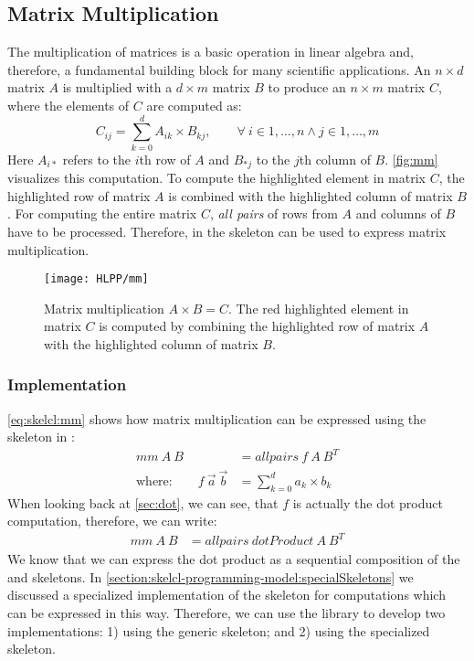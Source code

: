 \subsection{Matrix Multiplication}

The multiplication of matrices is a basic operation in linear algebra and, therefore, a fundamental building block for many scientific applications.
An $n\times d$ matrix $A$ is multiplied with a $d\times m$ matrix $B$ to produce an $n\times m$ matrix $C$, where the elements of $C$ are computed as:
\begin{equation*}
  C_{ij} = \sum_{k=0}^{d} A_{ik} \times B_{kj}, \qquad \forall\ i \in 1, \ldots, n \wedge j \in 1, \ldots, m
\end{equation*}
Here $A_{i*}$ refers to the $i$th row of $A$ and $B_{*j}$ to the $j$th column of $B$.
\autoref{fig:mm} visualizes this computation.
To compute the highlighted element in matrix $C$, the highlighted row of matrix $A$ is combined with the highlighted column of matrix $B$.
For computing the entire matrix $C$, \emph{all pairs} of rows from $A$ and columns of $B$ have to be processed.
Therefore, in \SkelCL the \allpairs skeleton can be used to express matrix multiplication.

\begin{figure}[tb]
  \centering
  \texttt{[image: HLPP/mm]}
  \caption[Visalization of matrix multiplication.]%
          {Matrix multiplication $A\times B = C$.
           The red highlighted element in matrix $C$ is computed by combining the highlighted row of matrix $A$ with the highlighted column of matrix $B$.}
  \label{fig:mm}
\end{figure}


\subsubsection*{\SkelCL Implementation}
\autoref{eq:skelcl:mm} shows how matrix multiplication can be expressed using the \allpairs skeleton in \SkelCL:
\begin{align}
  \label{eq:skelcl:mm}
  mm\ A\ B &= allpairs\ f\ A\ B^T\\
  \text{where:} \qquad f\ \vec{a}\ \vec{b} &= \sum_{k=0}^d a_k \times b_k \nonumber
\end{align}
When looking back at \autoref{sec:dot}, we can see, that $f$ is actually the dot product computation, therefore, we can write:
\begin{align}
  mm\ A\ B &= allpairs\ dotProduct\ A\ B^T
  \label{eq:skelcl:mm:dot}
\end{align}
We know that we can express the dot product as a sequential composition of the \zip and \reduce skeletons.
In \autoref{section:skelcl-programming-model:specialSkeletons} we discussed a specialized implementation of the \allpairs skeleton for computations which can be expressed in this way.
Therefore, we can use the \SkelCL library to develop two implementations:
1) using the generic \allpairs skeleton; and 2) using the specialized \allpairs skeleton.


